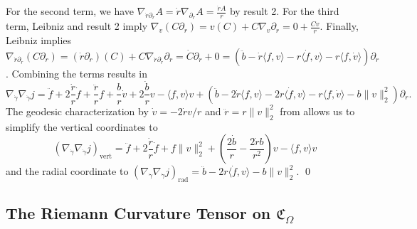 \documentclass{article}
\begin{document}
For the second term, we have $\nabla_{\dot r\partial_r}A = \dot r\nabla_{\partial_r}A = \frac{\dot rA}{r}$ by result 2. For the third term, Leibniz and result 2 imply $\nabla_v(C\partial_r) = v(C) + C\nabla_v\partial_r = 0 + \frac{Cv}{r}$. Finally, Leibniz implies $\nabla_{\dot r\partial_r}(C\partial_r) = (\dot r\partial_r)(C) + C\nabla_{\dot r\partial_r}\partial_r = \dot C \partial_r + 0 = (\ddot b - \dot r\langle f, v\rangle - r\langle \dot f, v\rangle - r \langle f, \dot v\rangle)\partial_r$. Combining the terms results in
\[\nabla_{\dot \gamma}\nabla_{\dot \gamma}j =  \ddot f + 2\frac{\dot r}{r}\dot f + \frac{\ddot r}{r}f+ \frac{b}{r}\dot v + 2\frac{\dot b}{r}v - \langle f,v\rangle v  + \left(\ddot b - 2\dot r \langle f, v\rangle -2r\langle \dot f, v\rangle - r\langle f, \dot v\rangle - b\|v\|_2^2\right)\partial_r.\]
The geodesic characterization by $\dot v = -2\dot rv/r$ and $\ddot r = r\|v\|_2^2$ from  allows us to simplify the vertical coordinates to
\[(\nabla_{\dot \gamma}\nabla_{\dot \gamma}j)_{\text{vert}} = \ddot f + 2\frac{\dot r}{r}\dot f + f\|v\|_2^2  + \left(\frac{2\dot b}{r} - \frac{2 \dot rb}{r^2}\right)v - \langle f,v\rangle v\]
and the radial coordinate to $(\nabla_{\dot \gamma}\nabla_{\dot \gamma}j)_{\text{rad}} = \ddot b - 2r\langle \dot f, v\rangle - b\|v\|_2^2.$
\qed{}


\subsection{The Riemann Curvature Tensor on $\mathfrak{C}_\Omega$}
\end{document}
